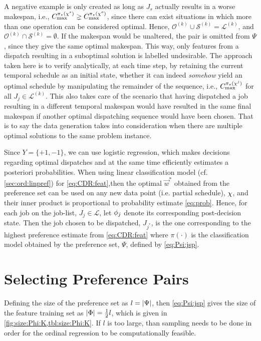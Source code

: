 A negative example is only created as long as $J_s$ actually 
results in a worse makespan, i.e., $C_{\max}^{\pi_\star({\mathbf{\chi}}^s)} \gneq 
C_{\max}^{\pi_\star({\mathbf{\chi}}^o)}$, since there can exist situations in which more 
than one operation can be considered optimal. 
Hence, $\mathcal{O}^{(k)}\cup\mathcal{S}^{(k)}=\mathcal{L}^{(k)}$, and 
$\mathcal{O}^{(k)}\cap\mathcal{S}^{(k)}=\emptyset$.
If the makespan would be unaltered, the pair is omitted from $\Psi$, since they 
give the same optimal makespan. 
This way, only features from a dispatch resulting in a suboptimal solution is 
labelled undesirable.
The approach taken here is to verify analytically, at each time step, by 
retaining the current temporal schedule as an initial state, whether it can 
indeed \emph{somehow} yield an optimal schedule by manipulating the remainder 
of the sequence, i.e., $C_{\max}^{\pi_\star({\mathbf{\chi}}^j)}$ for all 
$J_j\in\mathcal{L}^{(k)}$. 
This also takes care of the scenario that having dispatched a job resulting in 
a different temporal makespan would have resulted in the same final makespan if 
another optimal dispatching sequence would have been chosen. 
That is to say the data generation takes into consideration when there are 
multiple optimal solutions to the same problem instance. 

Since $Y=\{+1,-1\}$, we can use logistic regression, which makes decisions 
regarding optimal dispatches and at the same time efficiently estimates a 
posteriori probabilities. 
When using linear classification model (cf. \cref{sec:ord:linpref}) for 
\cref{eq:CDR:feat},then the optimal $\vec{w}^*$ obtained from the preference 
set can be used on any new data point (i.e. partial schedule), ${\mathbf{\chi}}$, and 
their inner product is proportional to probability estimate \cref{eq:prob}. 
Hence, for each job on the job-list, $J_j\in\mathcal{L}$, let ${\mathbf{\phi}}_j$ denote 
its corresponding post-decision state. Then the job chosen to be dispatched, 
$J_{j^*}$, is the one corresponding to the highest preference estimate
from \cref{eq:CDR:feat} where $\pi(\cdot)$ is the classification model obtained 
by the preference set, $\Psi$, defined by \cref{eq:Psi:jsp}. 

\section{Selecting Preference Pairs}\label{sec:trdat:param}
Defining the size of the preference set as $l=\lvert\Psi\rvert$, then 
\cref{eq:Psi:jsp} gives the size of the feature training set as 
$\lvert\Phi\rvert=\frac{1}{2}l$, which is given in 
\cref{fig:size:Phi:K,tbl:size:Phi:K}.
If $l$ is too large, than sampling needs to be done in order for the ordinal 
regression to be computationally feasible.

